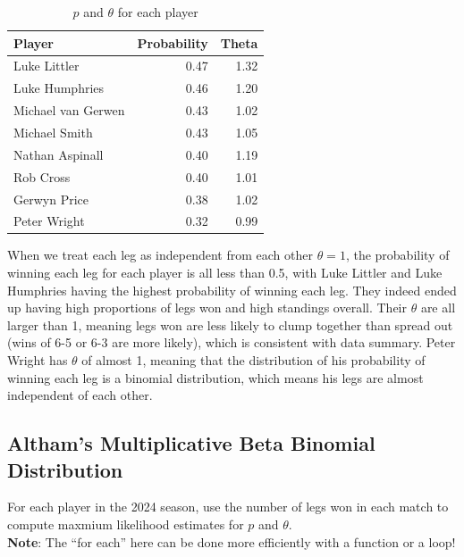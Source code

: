 \documentclass[
]{article}
\begin{document}
{

\begin{longtable}[]{@{}lrr@{}}

\caption{\label{tbl-probtheta}\(p\) and \(\theta\) for each player}

\tabularnewline

\toprule\noalign{}
Player & Probability & Theta \\
\midrule\noalign{}
\endhead
\bottomrule\noalign{}
\endlastfoot
Luke Littler & 0.47 & 1.32 \\
Luke Humphries & 0.46 & 1.20 \\
Michael van Gerwen & 0.43 & 1.02 \\
Michael Smith & 0.43 & 1.05 \\
Nathan Aspinall & 0.40 & 1.19 \\
Rob Cross & 0.40 & 1.01 \\
Gerwyn Price & 0.38 & 1.02 \\
Peter Wright & 0.32 & 0.99 \\

\end{longtable}

}

\normalsize

When we treat each leg as independent from each other \(\theta=1\), the
probability of winning each leg for each player is all less than 0.5,
with Luke Littler and Luke Humphries having the highest probability of
winning each leg. They indeed ended up having high proportions of legs
won and high standings overall. Their \(\theta\) are all larger than 1,
meaning legs won are less likely to clump together than spread out (wins
of 6-5 or 6-3 are more likely), which is consistent with data summary.
Peter Wright has \(\theta\) of almost 1, meaning that the distribution
of his probability of winning each leg is a binomial distribution, which
means his legs are almost independent of each other.

\subsection{Altham's Multiplicative Beta Binomial
Distribution}\label{althams-multiplicative-beta-binomial-distribution-1}

For each player in the 2024 season, use the number of legs won in each
match to compute maxmium likelihood estimates for \(p\) and
\(\theta\).\\
\textbf{Note}: The ``for each'' here can be done more efficiently with a
function or a loop!
\end{document}
